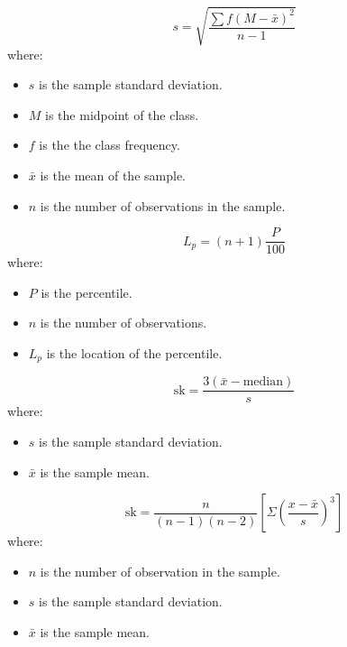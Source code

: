 \begin{equation}
\label{standard deviation of grouped data}
s = \sqrt{\frac{\sum f(M - \bar{x})^2}{n - 1}}
\end{equation}
where:
\begin{itemize}
 \item $s$ is the sample standard deviation.
 \item $M$ is the midpoint of the class.
 \item $f$ is the the class frequency.
 \item $\bar{x}$ is the mean of the sample.
 \item $n$ is the number of observations in the sample.
\end{itemize}
\hformbar


\begin{equation}
\label{location of percentile}
L_{p} = (n + 1)\frac{P}{100}
\end{equation}
where:
\begin{itemize}
 \item $P$ is the percentile.
 \item $n$ is the number of observations.
 \item $L_{p}$ is the location of the percentile.
\end{itemize} 
\hformbar



\begin{equation}
\label{coefficient of skewness}
\text{sk} = \frac{3(\bar{x} - \text{median})}{s}
\end{equation}
where:
\begin{itemize}
 \item $s$ is the sample standard deviation.
 \item $\bar{x}$ is the sample mean.
\end{itemize} 
\hformbar


\begin{equation}
\label{software coefficient of skewness}
\text{sk} = \frac{n}{(n - 1)(n - 2)}\left[\Sigma(\frac{x - \bar{x}}{s})^{3}\right]
\end{equation}
where:
\begin{itemize}
 \item $n$ is the number of observation in the sample.
 \item $s$ is the sample standard deviation.
 \item $\bar{x}$ is the sample mean.
\end{itemize} 
\hformbar


